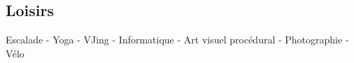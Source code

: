 \documentclass[margin,line]{res}
\begin{document}
\begin{resume}

\section{\sc Loisirs}
Escalade - Yoga - VJing -  Informatique - Art visuel procédural - Photographie - Vélo


\end{resume}
\end{document}

